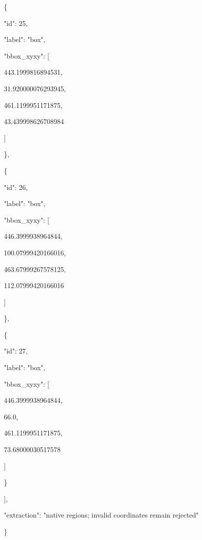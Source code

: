 \documentclass[10pt,a4paper]{article}
\begin{document}
    \{\par
      "id":\allowbreak{} 25,\allowbreak{}\par
      "label":\allowbreak{} "box",\allowbreak{}\par
      "bbox\_xyxy":\allowbreak{} [\par
        443.1999816894531,\allowbreak{}\par
        31.920000076293945,\allowbreak{}\par
        461.1199951171875,\allowbreak{}\par
        43.439998626708984\par
      ]\par
    \},\allowbreak{}\par
    \{\par
      "id":\allowbreak{} 26,\allowbreak{}\par
      "label":\allowbreak{} "box",\allowbreak{}\par
      "bbox\_xyxy":\allowbreak{} [\par
        446.3999938964844,\allowbreak{}\par
        100.07999420166016,\allowbreak{}\par
        463.67999267578125,\allowbreak{}\par
        112.07999420166016\par
      ]\par
    \},\allowbreak{}\par
    \{\par
      "id":\allowbreak{} 27,\allowbreak{}\par
      "label":\allowbreak{} "box",\allowbreak{}\par
      "bbox\_xyxy":\allowbreak{} [\par
        446.3999938964844,\allowbreak{}\par
        66.0,\allowbreak{}\par
        461.1199951171875,\allowbreak{}\par
        73.68000030517578\par
      ]\par
    \}\par
  ],\allowbreak{}\par
  "extraction":\allowbreak{} "native regions; invalid coordinates remain rejected"\par
\}
\end{document}
